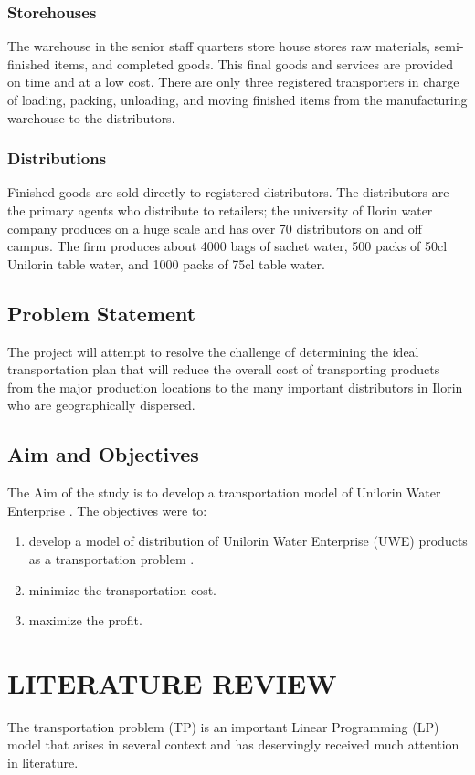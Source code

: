 \documentclass[12pt]{report}
\newcommand{\stp}{transportation problem }
\newcommand{\uwe}{Unilorin Water Enterprise }
\begin{document}
	\subsection{Storehouses}
	The warehouse in the senior staff quarters store house stores raw materials, semi-finished items, and completed goods. This final goods and services are provided on time and at a low cost. There are only three registered transporters in charge of loading, packing, unloading, and moving finished items from the manufacturing warehouse to the distributors.
	
	\subsection{Distributions}
	Finished goods are sold directly to registered distributors. The distributors are the primary agents who distribute to retailers; the university of Ilorin water company produces on a huge scale and has over 70 distributors on and off campus. The firm produces about 4000 bags of sachet water, 500 packs of 50cl Unilorin table water, and 1000 packs of 75cl table water.

	\section{Problem Statement}
	The project will attempt to resolve the challenge of determining the ideal transportation plan that will reduce the overall cost of transporting products from the major production locations to the many important distributors in Ilorin who are geographically dispersed.

	\section{Aim and Objectives}
	The Aim of the study is to develop a transportation model of \uwe. The objectives  were to:
	\begin{enumerate}
		\renewcommand{\labelenumi}{(\roman{enumi})}
		\item develop a model of distribution of Unilorin Water Enterprise (UWE) products as a \stp.
		\item minimize the transportation cost.
		\item maximize the profit.
	\end{enumerate}

	
	\chapter{LITERATURE REVIEW}
	The \stp (TP) is an important Linear Programming (LP) model that arises in several context and has deservingly received much attention in literature.\\
	
\end{document}
